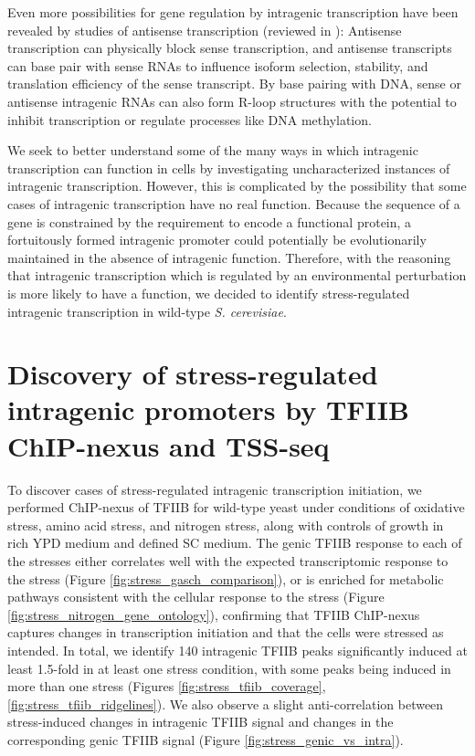 Even more possibilities for gene regulation by intragenic transcription have been revealed by studies of antisense transcription (reviewed in \citet{pelechano2013b}): Antisense transcription can physically block sense transcription, and antisense transcripts can base pair with sense RNAs to influence isoform selection, stability, and translation efficiency of the sense transcript.
By base pairing with DNA, sense or antisense intragenic RNAs can also form R-loop structures with the potential to inhibit transcription or regulate processes like DNA methylation.

We seek to better understand some of the many ways in which intragenic transcription can function in cells by investigating uncharacterized instances of intragenic transcription.
However, this is complicated by the possibility that some cases of intragenic transcription have no real function.
Because the sequence of a gene is constrained by the requirement to encode a functional protein, a fortuitously formed intragenic promoter could potentially be evolutionarily maintained in the absence of intragenic function.
Therefore, with the reasoning that intragenic transcription which is regulated by an environmental perturbation is more likely to have a function, we decided to identify stress-regulated intragenic transcription in wild-type \textit{S. cerevisiae}.


\section{Discovery of stress-regulated intragenic promoters by TFIIB ChIP-nexus and TSS-seq}

To discover cases of stress-regulated intragenic transcription initiation, we performed ChIP-nexus of TFIIB for wild-type yeast under conditions of oxidative stress, amino acid stress, and nitrogen stress, along with controls of growth in rich YPD medium and defined SC medium.
The genic TFIIB response to each of the stresses either correlates well with the expected transcriptomic response to the stress (Figure \ref{fig:stress_gasch_comparison}), or is enriched for metabolic pathways consistent with the cellular response to the stress (Figure \ref{fig:stress_nitrogen_gene_ontology}), confirming that TFIIB ChIP-nexus captures changes in transcription initiation and that the cells were stressed as intended.
In total, we identify 140 intragenic TFIIB peaks significantly induced at least 1.5-fold in at least one stress condition, with some peaks being induced in more than one stress (Figures \ref{fig:stress_tfiib_coverage}, \ref{fig:stress_tfiib_ridgelines}).
We also observe a slight anti-correlation between stress-induced changes in intragenic TFIIB signal and changes in the corresponding genic TFIIB signal (Figure \ref{fig:stress_genic_vs_intra}).

